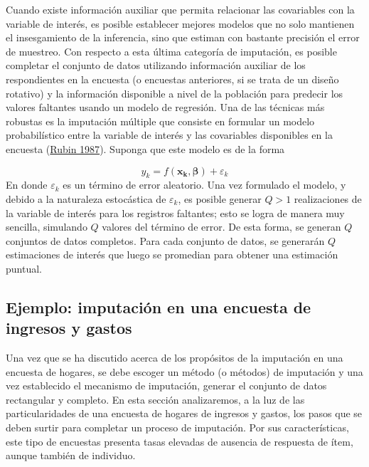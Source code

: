 \documentclass[
  12pt,
  spanish,
]{book}
\begin{document}
Cuando existe información auxiliar que permita relacionar las covariables con la variable de interés, es posible establecer mejores modelos que no solo mantienen el insesgamiento de la inferencia, sino que estiman con bastante precisión el error de muestreo. Con respecto a esta última categoría de imputación, es posible completar el conjunto de datos utilizando información auxiliar de los respondientes en la encuesta (o encuestas anteriores, si se trata de un diseño rotativo) y la información disponible a nivel de la población para predecir los valores faltantes usando un modelo de regresión. Una de las técnicas más robustas es la imputación múltiple que consiste en formular un modelo probabilístico entre la variable de interés y las covariables disponibles en la encuesta (\protect\hyperlink{ref-Rubin_1987}{Rubin 1987}). Suponga que este modelo es de la forma

\[y_k = f(\mathbf{x_k},\boldsymbol{\beta}) + \varepsilon_k \]
En donde \(\varepsilon_k\) es un término de error aleatorio. Una vez formulado el modelo, y debido a la naturaleza estocástica de \(\varepsilon_k\), es posible generar \(Q>1\) realizaciones de la variable de interés para los registros faltantes; esto se logra de manera muy sencilla, simulando \(Q\) valores del término de error. De esta forma, se generan \(Q\) conjuntos de datos completos. Para cada conjunto de datos, se generarán \(Q\) estimaciones de interés que luego se promedian para obtener una estimación puntual.

\hypertarget{ejemplo-imputaciuxf3n-en-una-encuesta-de-ingresos-y-gastos}{%
\subsection{Ejemplo: imputación en una encuesta de ingresos y gastos}\label{ejemplo-imputaciuxf3n-en-una-encuesta-de-ingresos-y-gastos}}

Una vez que se ha discutido acerca de los propósitos de la imputación en una encuesta de hogares, se debe escoger un método (o métodos) de imputación y una vez establecido el mecanismo de imputación, generar el conjunto de datos rectangular y completo. En esta sección analizaremos, a la luz de las particularidades de una encuesta de hogares de ingresos y gastos, los pasos que se deben surtir para completar un proceso de imputación. Por sus características, este tipo de encuestas presenta tasas elevadas de ausencia de respuesta de ítem, aunque también de individuo.
\end{document}
